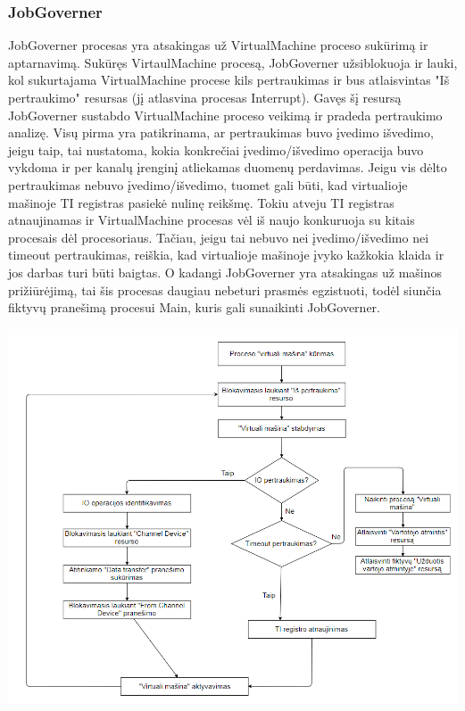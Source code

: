 \documentclass{scrartcl}
\begin{document}
      \subsubsection{JobGoverner}
        JobGoverner procesas yra atsakingas už VirtualMachine proceso sukūrimą ir aptarnavimą. Sukūręs VirtaulMachine procesą, JobGoverner užsiblokuoja ir lauki, kol sukurtajama VirtualMachine procese kils pertraukimas ir bus atlaisvintas "Iš pertraukimo" resursas (jį atlasvina procesas Interrupt). Gavęs šį resursą JobGoverner sustabdo VirtualMachine proceso veikimą ir pradeda pertraukimo analizę. Visų pirma yra patikrinama, ar pertraukimas buvo įvedimo išvedimo, jeigu taip, tai nustatoma, kokia konkrečiai įvedimo/išvedimo operacija buvo vykdoma ir per kanalų įrenginį atliekamas duomenų perdavimas. Jeigu vis dėlto pertraukimas nebuvo įvedimo/išvedimo, tuomet gali būti, kad virtualioje mašinoje TI registras pasiekė nulinę reikšmę. Tokiu atveju TI registras atnaujinamas ir VirtualMachine procesas vėl iš naujo konkuruoja su kitais procesais dėl procesoriaus. Tačiau, jeigu tai nebuvo nei įvedimo/išvedimo nei timeout pertraukimas, reiškia, kad virtualioje mašinoje įvyko kažkokia klaida ir jos darbas turi būti baigtas. O kadangi JobGoverner yra atsakingas už mašinos prižiūrėjimą, tai šis procesas daugiau nebeturi prasmės egzistuoti, todėl siunčia fiktyvų pranešimą procesui Main, kuris gali sunaikinti JobGoverner.
        \begin{center}
          \includegraphics[width=\textwidth]{JobGoverner}
        \end{center}
\end{document}
